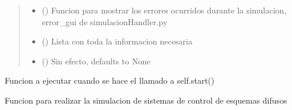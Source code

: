 \documentclass[letterpaper,10pt,spanish]{sphinxmanual}
\begin{document}
\begin{fulllineitems}
\begin{fulllineitems}
\begin{quote}
\begin{description}
\begin{itemize}
\item {} 
 () \textendash{} Funcion para mostrar los errores ocurridos durante la simulacion, error\_gui de simulacionHandler.py

\item {} 
 () \textendash{} Lista con toda la informacion necesaria

\item {} 
 (\sphinxstyleliteralemphasis{\sphinxupquote{, }}) \textendash{} Sin efecto, defaults to None

\end{itemize}

\end{description}\end{quote}

\end{fulllineitems}


\begin{fulllineitems}
\label{\detokenize{codigos/rutinas_simulacion:rutinas_simulacion.SimpleThread.run}}
Funcion a ejecutar cuando se hace el llamado a self.start()

\end{fulllineitems}


\begin{fulllineitems}
\label{\detokenize{codigos/rutinas_simulacion:rutinas_simulacion.SimpleThread.run_fuzzy}}
Funcion para realizar la simulacion de sistemas de control de esquemas difusos

\end{fulllineitems}



\end{fulllineitems}
\end{document}
